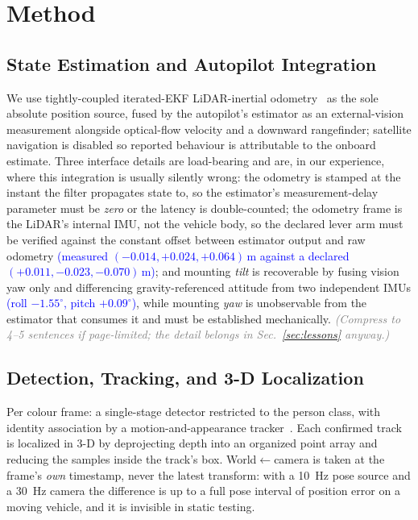 \documentclass[conference]{IEEEtran}
\newcommand{\bench}[1]{\textcolor{blue}{#1}}
\newcommand{\note}[1]{\textcolor{gray}{\textit{(#1)}}}
\begin{document}
\section{Method}
\label{sec:method}

\subsection{State Estimation and Autopilot Integration}
\label{sec:state}
We use tightly-coupled iterated-EKF LiDAR-inertial odometry~\cite{xu2022fastlio2}
as the sole absolute position source, fused by the autopilot's estimator as an
external-vision measurement alongside optical-flow velocity and a downward
rangefinder; satellite navigation is disabled so reported behaviour is
attributable to the onboard estimate. Three interface details are load-bearing
and are, in our experience, where this integration is usually silently wrong:
the odometry is stamped at the instant the filter propagates state to, so the
estimator's measurement-delay parameter must be \emph{zero} or the latency is
double-counted; the odometry frame is the LiDAR's internal IMU, not the vehicle
body, so the declared lever arm must be verified against the constant offset
between estimator output and raw odometry \bench{(measured $(-0.014, +0.024,
+0.064)$\,m against a declared $(+0.011,-0.023,-0.070)$\,m)}; and mounting
\emph{tilt} is recoverable by fusing vision yaw only and differencing
gravity-referenced attitude from two independent IMUs \bench{(roll $-1.55^\circ$,
pitch $+0.09^\circ$)}, while mounting \emph{yaw} is unobservable from the
estimator that consumes it and must be established mechanically.
\note{Compress to 4--5 sentences if page-limited; the detail belongs in
Sec.~\ref{sec:lessons} anyway.}

\subsection{Detection, Tracking, and 3-D Localization}
\label{sec:perception}
Per colour frame: a single-stage detector restricted to the person class, with
identity association by a motion-and-appearance
tracker~\cite{aharon2022botsort,zhang2022bytetrack}. Each confirmed track is
localized in 3-D by deprojecting depth into an organized point array and reducing
the samples inside the track's box. World$\leftarrow$camera is taken at the
frame's \emph{own} timestamp, never the latest transform: with a
\SI{10}{\hertz} pose source and a \SI{30}{\hertz} camera the difference is up to
a full pose interval of position error on a moving vehicle, and it is invisible
in static testing.
\end{document}
